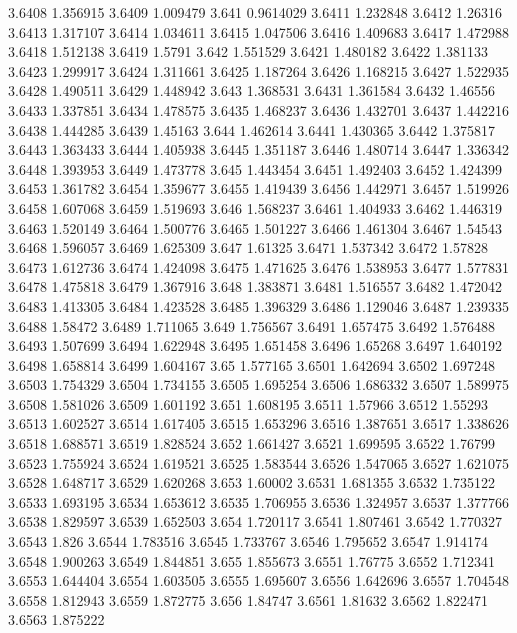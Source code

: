 3.6408  1.356915
3.6409  1.009479
3.641  0.9614029
3.6411  1.232848
3.6412  1.26316
3.6413  1.317107
3.6414  1.034611
3.6415  1.047506
3.6416  1.409683
3.6417  1.472988
3.6418  1.512138
3.6419  1.5791
3.642  1.551529
3.6421  1.480182
3.6422  1.381133
3.6423  1.299917
3.6424  1.311661
3.6425  1.187264
3.6426  1.168215
3.6427  1.522935
3.6428  1.490511
3.6429  1.448942
3.643  1.368531
3.6431  1.361584
3.6432  1.46556
3.6433  1.337851
3.6434  1.478575
3.6435  1.468237
3.6436  1.432701
3.6437  1.442216
3.6438  1.444285
3.6439  1.45163
3.644  1.462614
3.6441  1.430365
3.6442  1.375817
3.6443  1.363433
3.6444  1.405938
3.6445  1.351187
3.6446  1.480714
3.6447  1.336342
3.6448  1.393953
3.6449  1.473778
3.645  1.443454
3.6451  1.492403
3.6452  1.424399
3.6453  1.361782
3.6454  1.359677
3.6455  1.419439
3.6456  1.442971
3.6457  1.519926
3.6458  1.607068
3.6459  1.519693
3.646  1.568237
3.6461  1.404933
3.6462  1.446319
3.6463  1.520149
3.6464  1.500776
3.6465  1.501227
3.6466  1.461304
3.6467  1.54543
3.6468  1.596057
3.6469  1.625309
3.647  1.61325
3.6471  1.537342
3.6472  1.57828
3.6473  1.612736
3.6474  1.424098
3.6475  1.471625
3.6476  1.538953
3.6477  1.577831
3.6478  1.475818
3.6479  1.367916
3.648  1.383871
3.6481  1.516557
3.6482  1.472042
3.6483  1.413305
3.6484  1.423528
3.6485  1.396329
3.6486  1.129046
3.6487  1.239335
3.6488  1.58472
3.6489  1.711065
3.649  1.756567
3.6491  1.657475
3.6492  1.576488
3.6493  1.507699
3.6494  1.622948
3.6495  1.651458
3.6496  1.65268
3.6497  1.640192
3.6498  1.658814
3.6499  1.604167
3.65  1.577165
3.6501  1.642694
3.6502  1.697248
3.6503  1.754329
3.6504  1.734155
3.6505  1.695254
3.6506  1.686332
3.6507  1.589975
3.6508  1.581026
3.6509  1.601192
3.651  1.608195
3.6511  1.57966
3.6512  1.55293
3.6513  1.602527
3.6514  1.617405
3.6515  1.653296
3.6516  1.387651
3.6517  1.338626
3.6518  1.688571
3.6519  1.828524
3.652  1.661427
3.6521  1.699595
3.6522  1.76799
3.6523  1.755924
3.6524  1.619521
3.6525  1.583544
3.6526  1.547065
3.6527  1.621075
3.6528  1.648717
3.6529  1.620268
3.653  1.60002
3.6531  1.681355
3.6532  1.735122
3.6533  1.693195
3.6534  1.653612
3.6535  1.706955
3.6536  1.324957
3.6537  1.377766
3.6538  1.829597
3.6539  1.652503
3.654  1.720117
3.6541  1.807461
3.6542  1.770327
3.6543  1.826
3.6544  1.783516
3.6545  1.733767
3.6546  1.795652
3.6547  1.914174
3.6548  1.900263
3.6549  1.844851
3.655  1.855673
3.6551  1.76775
3.6552  1.712341
3.6553  1.644404
3.6554  1.603505
3.6555  1.695607
3.6556  1.642696
3.6557  1.704548
3.6558  1.812943
3.6559  1.872775
3.656  1.84747
3.6561  1.81632
3.6562  1.822471
3.6563  1.875222
